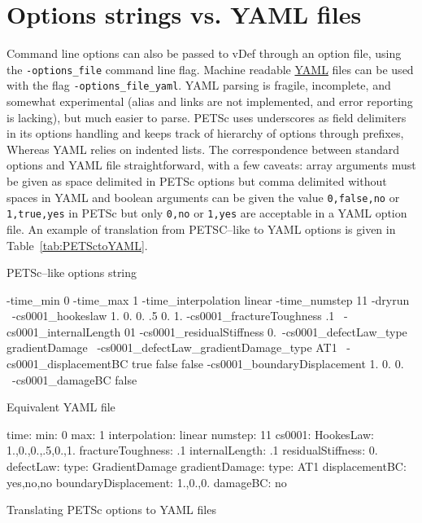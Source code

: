\documentclass[10pt,oneside]{memoir}
\begin{document}
\section{Options strings vs. YAML files}
Command line options can also be passed to vDef through an option file, using the \verb+-options_file+ command line flag. Machine readable \href{http://www.yaml.org}{YAML} files can be used with the flag \verb+-options_file_yaml+. YAML parsing is fragile, incomplete, and somewhat experimental (alias and links are not implemented, and error reporting is lacking), but much easier to parse. PETSc  uses  underscores as field delimiters in its options handling and keeps track of hierarchy of options through prefixes, Whereas YAML relies on indented lists. The correspondence between standard options and YAML file straightforward, with a few caveats: array arguments must be given as space delimited in PETSc options but comma delimited without spaces in YAML and boolean arguments can be given the value \verb+0,false,no+ or \verb+1,true,yes+ in PETSc but only \verb+0,no+ or \verb+1,yes+ are acceptable in a YAML option file. An example of translation from PETSC--like to YAML options is given in Table~\ref{tab:PETSctoYAML}.

\begin{table}
PETSc--like options string\\
\small{
\begin{boxedverbatim}
-time_min 0 -time_max 1 -time_interpolation linear -time_numstep 11  -dryrun \
-cs0001_hookeslaw 1. 0. 0. .5 0. 1. -cs0001_fractureToughness .1 \
-cs0001_internalLength 01 -cs0001_residualStiffness 0.\
-cs0001_defectLaw_type gradientDamage \
-cs0001_defectLaw_gradientDamage_type AT1 \
-cs0001_displacementBC true false false -cs0001_boundaryDisplacement 1. 0. 0. \
-cs0001_damageBC false
\end{boxedverbatim}
}
Equivalent YAML file\\
\small{
\begin{boxedverbatim}
time:
    min: 0
    max: 1
    interpolation: linear
    numstep: 11
cs0001:
    HookesLaw: 1.,0.,0.,.5,0.,1.
    fractureToughness: .1
    internalLength: .1
    residualStiffness: 0.
    defectLaw:
        type: GradientDamage
        gradientDamage:
            type: AT1
    displacementBC: yes,no,no
    boundaryDisplacement: 1.,0.,0.
    damageBC: no
\end{boxedverbatim}
}
\caption{Translating PETSc options to YAML files}
\label{tab:PETSctoYAML}
\end{table}
\end{document}
